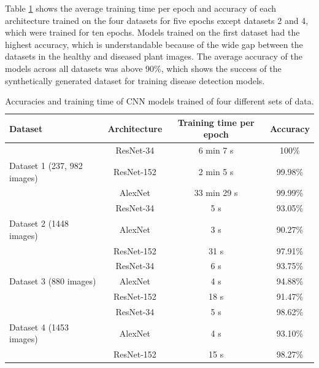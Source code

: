 Table \ref{table:accuracy} shows the average training time per epoch and accuracy of each architecture trained on the four datasets for five epochs except datasets 2 and 4, which were trained for ten epochs. Models trained on the first dataset had the highest accuracy, which is understandable because of the wide gap between the datasets in the healthy and diseased plant images. The average accuracy of the models across all datasets was above 90\%, which shows the success of the synthetically generated dataset for training disease detection models.

\begin{table}[H]
\centering 
 \begin{tabular}{p{5cm}|c|c|c} 
 \hline
  Dataset & Architecture  & Training time per epoch & Accuracy \\ [0.5ex] 
 \hline
 & ResNet-34 & 6 min 7 s & 100\%  \\ 
 
 Dataset 1 (237, 982 images) & ResNet-152 & 2 min 5 s&99.98\% \\ 
 
 & AlexNet & 33 min 29 s&99.99\% \\ 
 \hline
 \hline
 & ResNet-34 & 5 s & 93.05\%  \\ 
 
 Dataset 2 (1448 images) & AlexNet & 3 s & 90.27\% \\ 
 
 & ResNet-152 & 31 s & 97.91\% \\ 
 \hline
 \hline
 & ResNet-34 & 6 s & 93.75\%  \\ 
 
 Dataset 3 (880 images) & AlexNet & 4 s & 94.88\% \\ 
 
 & ResNet-152 & 18 s & 91.47\% \\ 
 \hline
 \hline
 & ResNet-34 & 5 s & 98.62\%  \\ 
 
 Dataset 4 (1453 images) & AlexNet & 4 s & 93.10\% \\ 
 
 & ResNet-152 & 15 s & 98.27\% \\ 
 \hline
 \end{tabular}
 \caption{Accuracies and training time of CNN models trained of four different sets of data.}
 \label{table:accuracy}
\end{table}

